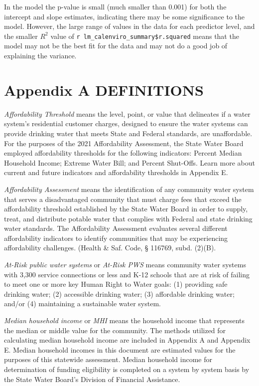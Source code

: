 \documentclass[
  letterpaper,
  DIV=11,
  numbers=noendperiod]{scrartcl}
\begin{document}
In the model the p-value is small (much smaller than 0.001) for both the
intercept and slope estimates, indicating there may be some significance
to the model. However, the large range of values in the data for each
predictor level, and the smaller \(R^2\) value of
\texttt{r\ lm\_calenviro\_summary\$r.squared} means that the model may
not be the best fit for the data and may not do a good job of explaining
the variance.

\section{Appendix A DEFINITIONS}\label{sec-definitions}

\emph{Affordability Threshold} means the level, point, or value that
delineates if a water system's residential customer charges, designed to
ensure the water systems can provide drinking water that meets State and
Federal standards, are unaffordable. For the purposes of the 2021
Affordability Assessment, the State Water Board employed affordability
thresholds for the following indicators: Percent Median Household
Income; Extreme Water Bill; and Percent Shut-Offs. Learn more about
current and future indicators and affordability thresholds in Appendix
E.

\emph{Affordability Assessment} means the identification of any
community water system that serves a disadvantaged community that must
charge fees that exceed the affordability threshold established by the
State Water Board in order to supply, treat, and distribute potable
water that complies with Federal and state drinking water standards. The
Affordability Assessment evaluates several different affordability
indicators to identify communities that may be experiencing
affordability challenges. (Health \& Saf. Code, § 116769, subd. (2)(B).

\emph{At-Risk public water systems} or \emph{At-Risk PWS} means
community water systems with 3,300 service connections or less and K-12
schools that are at risk of failing to meet one or more key Human Right
to Water goals: (1) providing safe drinking water; (2) accessible
drinking water; (3) affordable drinking water; and/or (4) maintaining a
sustainable water system.

\emph{Median household income} or \emph{MHI} means the household income
that represents the median or middle value for the community. The
methods utilized for calculating median household income are included in
Appendix A and Appendix E. Median household incomes in this document are
estimated values for the purposes of this statewide assessment. Median
household income for determination of funding eligibility is completed
on a system by system basis by the State Water Board's Division of
Financial Assistance.
\end{document}
